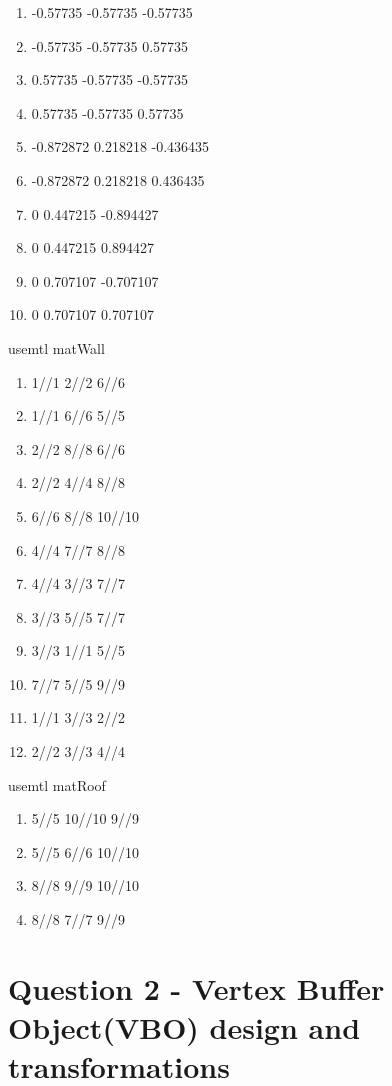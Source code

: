 \documentclass[10pt]{report}
\begin{document}
\begin{enumerate}[vn]
    \item -0.57735 -0.57735 -0.57735 %
    \item -0.57735 -0.57735 0.57735 %
    \item 0.57735 -0.57735 -0.57735 %
    \item 0.57735 -0.57735 0.57735 %
    \item -0.872872 0.218218 -0.436435 %
    \item -0.872872 0.218218 0.436435 %
    \item 0 0.447215 -0.894427 %
    \item 0 0.447215 0.894427 %
    \item 0 0.707107 -0.707107 %
    \item 0 0.707107 0.707107 %
\end{enumerate}  

usemtl matWall
\begin{enumerate}[f]
    \item 1//1 2//2 6//6
    \item 1//1 6//6 5//5
    \item 2//2 8//8 6//6
    \item 2//2 4//4 8//8
    \item 6//6 8//8 10//10
    \item 4//4 7//7 8//8
    \item 4//4 3//3 7//7
    \item 3//3 5//5 7//7
    \item 3//3 1//1 5//5
    \item 7//7 5//5 9//9
    \item 1//1 3//3 2//2
    \item 2//2 3//3 4//4
\end{enumerate}
usemtl matRoof
\begin{enumerate}[f]
    \item 5//5 10//10 9//9
    \item 5//5 6//6 10//10
    \item 8//8 9//9 10//10
    \item 8//8 7//7 9//9
\end{enumerate}


\chapter{Question 2 - Vertex Buffer Object(VBO) design and transformations}
\end{document}
